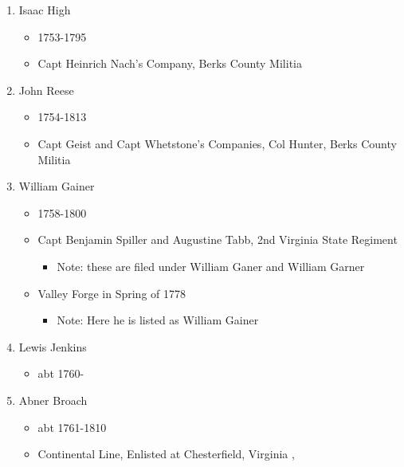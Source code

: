 \documentclass[11pt,letter]{book}
\begin{document}
\begin{enumerate}
\item Isaac High
\begin{itemize}
\item 1753-1795
\item Capt Heinrich Nach's Company, Berks County Militia 
\end{itemize}

\item John Reese
\begin{itemize}
\item 1754-1813
\item Capt Geist and Capt Whetstone's Companies, Col Hunter, Berks County Militia 
\end{itemize}

\item William Gainer
\begin{itemize}
\item 1758-1800
\item Capt Benjamin Spiller and Augustine Tabb, 2nd Virginia State Regiment 
\begin{itemize}
\item Note: these are filed under William Ganer and William Garner
\end{itemize}
\item Valley Forge in Spring of 1778 
\begin{itemize}
\item Note: Here he is listed as William Gainer 
\end{itemize}
\end{itemize}

\item Lewis Jenkins
\begin{itemize}
\item abt 1760-
\end{itemize}

\item Abner Broach
\begin{itemize}
\item abt 1761-1810
\item Continental Line, Enlisted at Chesterfield, Virginia ,
\end{itemize}


\end{enumerate}
\end{document}
